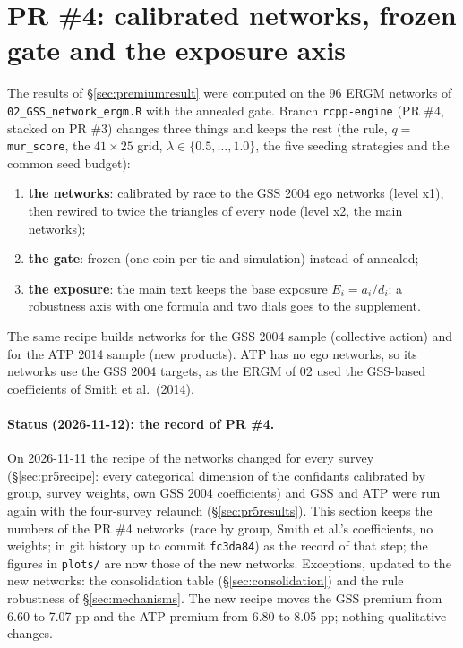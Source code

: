 \documentclass[11pt,a4paper]{article}
\newcommand{\code}[1]{\texttt{#1}}
\begin{document}
\section{PR \#4: calibrated networks, frozen gate and the exposure axis}
\label{sec:pr4}

The results of \S\ref{sec:premiumresult} were computed on the 96 ERGM networks of
\code{02\_GSS\_network\_ergm.R} with the annealed gate. Branch \code{rcpp-engine} (PR \#4,
stacked on PR \#3) changes three things and keeps the rest (the rule, $q = $
\code{mur\_score}, the $41 \times 25$ grid, $\lambda \in \{0.5, \dots, 1.0\}$, the five
seeding strategies and the common seed budget):
\begin{enumerate}
  \item \textbf{the networks}: calibrated by race to the GSS 2004 ego networks (level x1),
    then rewired to twice the triangles of every node (level x2, the main networks);
  \item \textbf{the gate}: frozen (one coin per tie and simulation) instead of annealed;
  \item \textbf{the exposure}: the main text keeps the base exposure $E_i = a_i/d_i$; a
    robustness axis with one formula and two dials goes to the supplement.
\end{enumerate}
The same recipe builds networks for the GSS 2004 sample (collective action) and for the
ATP 2014 sample (new products). ATP has no ego networks, so its networks use the GSS 2004
targets, as the ERGM of 02 used the GSS-based coefficients of Smith et al.\ (2014).

\paragraph{Status (2026-11-12): the record of PR \#4.} On 2026-11-11 the recipe of the networks
changed for every survey (\S\ref{sec:pr5recipe}: every categorical dimension of the confidants
calibrated by group, survey weights, own GSS 2004 coefficients) and GSS and ATP were run again
with the four-survey relaunch (\S\ref{sec:pr5results}). This section keeps the numbers of the PR \#4
networks (race by group, Smith et al.'s coefficients, no weights; in git history up to commit
\code{fc3da84}) as the record of that step; the figures in \code{plots/} are now those of the new
networks. Exceptions, updated to the new networks: the consolidation table
(\S\ref{sec:consolidation}) and the rule robustness of \S\ref{sec:mechanisms}. The new recipe moves
the GSS premium from 6.60 to 7.07 pp and the ATP premium from 6.80 to 8.05 pp; nothing qualitative
changes.
\end{document}
